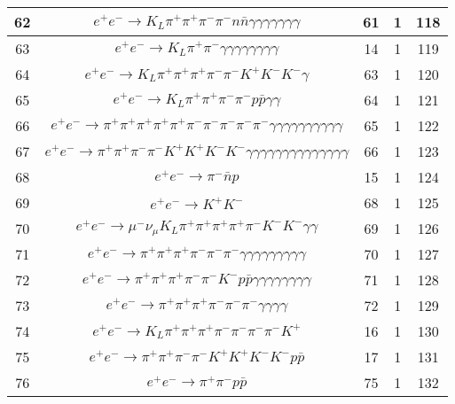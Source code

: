 \documentclass[landscape]{article}
\begin{document}
\begin{table}[htbp!]
\begin{tabular}{|c|c|c|c|c|}
\hline
62 & $ e^{+} e^{-} \rightarrow K_{L} \pi^{+} \pi^{+} \pi^{-} \pi^{-} n \bar{n} \gamma \gamma \gamma \gamma \gamma \gamma \gamma $ & 61 & 1 & 118 \\
\hline
63 & $ e^{+} e^{-} \rightarrow K_{L} \pi^{+} \pi^{-} \gamma \gamma \gamma \gamma \gamma \gamma \gamma \gamma $ & 14 & 1 & 119 \\
\hline
64 & $ e^{+} e^{-} \rightarrow K_{L} \pi^{+} \pi^{+} \pi^{+} \pi^{-} \pi^{-} K^{+} K^{-} K^{-} \gamma $ & 63 & 1 & 120 \\
\hline
65 & $ e^{+} e^{-} \rightarrow K_{L} \pi^{+} \pi^{+} \pi^{-} \pi^{-} p \bar{p} \gamma \gamma $ & 64 & 1 & 121 \\
\hline
66 & $ e^{+} e^{-} \rightarrow \pi^{+} \pi^{+} \pi^{+} \pi^{+} \pi^{+} \pi^{-} \pi^{-} \pi^{-} \pi^{-} \pi^{-} \gamma \gamma \gamma \gamma \gamma \gamma \gamma \gamma \gamma \gamma $ & 65 & 1 & 122 \\
\hline
67 & $ e^{+} e^{-} \rightarrow \pi^{+} \pi^{+} \pi^{-} \pi^{-} K^{+} K^{+} K^{-} K^{-} \gamma \gamma \gamma \gamma \gamma \gamma \gamma \gamma \gamma \gamma \gamma \gamma \gamma \gamma $ & 66 & 1 & 123 \\
\hline
68 & $ e^{+} e^{-} \rightarrow \pi^{-} \bar{n} p $ & 15 & 1 & 124 \\
\hline
69 & $ e^{+} e^{-} \rightarrow K^{+} K^{-} $ & 68 & 1 & 125 \\
\hline
70 & $ e^{+} e^{-} \rightarrow \mu^{-} \nu_{\mu} K_{L} \pi^{+} \pi^{+} \pi^{+} \pi^{+} \pi^{-} K^{-} K^{-} \gamma \gamma $ & 69 & 1 & 126 \\
\hline
71 & $ e^{+} e^{-} \rightarrow \pi^{+} \pi^{+} \pi^{+} \pi^{-} \pi^{-} \pi^{-} \gamma \gamma \gamma \gamma \gamma \gamma \gamma \gamma \gamma $ & 70 & 1 & 127 \\
\hline
72 & $ e^{+} e^{-} \rightarrow \pi^{+} \pi^{+} \pi^{+} \pi^{-} \pi^{-} K^{-} p \bar{p} \gamma \gamma \gamma \gamma \gamma \gamma \gamma \gamma $ & 71 & 1 & 128 \\
\hline
73 & $ e^{+} e^{-} \rightarrow \pi^{+} \pi^{+} \pi^{+} \pi^{-} \pi^{-} \pi^{-} \gamma \gamma \gamma \gamma $ & 72 & 1 & 129 \\
\hline
74 & $ e^{+} e^{-} \rightarrow K_{L} \pi^{+} \pi^{+} \pi^{+} \pi^{-} \pi^{-} \pi^{-} \pi^{-} K^{+} $ & 16 & 1 & 130 \\
\hline
75 & $ e^{+} e^{-} \rightarrow \pi^{+} \pi^{+} \pi^{-} \pi^{-} K^{+} K^{+} K^{-} K^{-} p \bar{p} $ & 17 & 1 & 131 \\
\hline
76 & $ e^{+} e^{-} \rightarrow \pi^{+} \pi^{-} p \bar{p} $ & 75 & 1 & 132 \\

\end{tabular}
\end{table}
\end{document}
